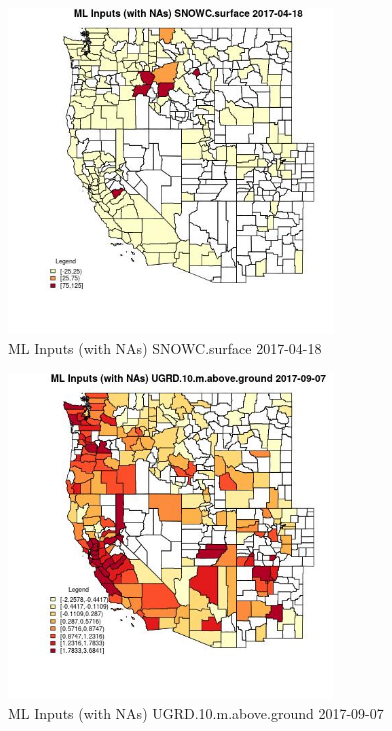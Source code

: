 \begin{figure} 
\centering  
\includegraphics[width=0.77\textwidth]{Code_Outputs/Report_ML_input_PM25_Step4_part_e_de_duplicated_aves_compiled_2019-05-21wNAs_CountySNOWCsurfaceMean2017-04-18.jpg} 
\caption{\label{fig:Report_ML_input_PM25_Step4_part_e_de_duplicated_aves_compiled_2019-05-21wNAsCountySNOWCsurfaceMean2017-04-18}ML Inputs (with NAs) SNOWC.surface 2017-04-18} 
\end{figure} 
 

\clearpage 

\begin{figure} 
\centering  
\includegraphics[width=0.77\textwidth]{Code_Outputs/Report_ML_input_PM25_Step4_part_e_de_duplicated_aves_compiled_2019-05-21wNAs_CountyUGRD10mabovegroundMean2017-09-07.jpg} 
\caption{\label{fig:Report_ML_input_PM25_Step4_part_e_de_duplicated_aves_compiled_2019-05-21wNAsCountyUGRD10mabovegroundMean2017-09-07}ML Inputs (with NAs) UGRD.10.m.above.ground 2017-09-07} 
\end{figure} 
 

